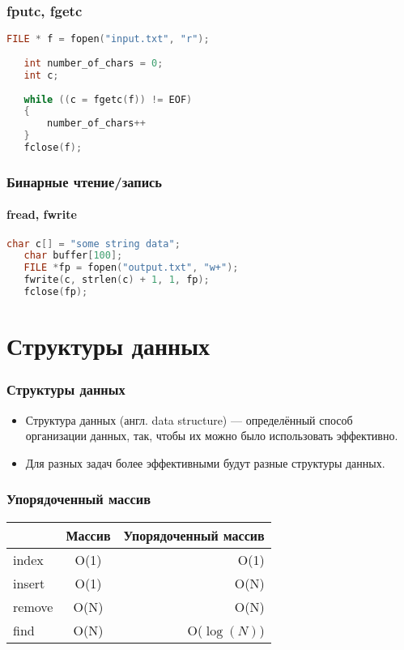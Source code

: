 \documentclass[12pt,pdf,hyperref={unicode}]{beamer}
\begin{document}
\begin{frame}[fragile]
\frametitle{fputc, fgetc}  
\begin{lstlisting}[language=C++,basicstyle=\ttfamily,keywordstyle=\color{blue},stringstyle=\color{orange}\ttfamily]
   FILE * f = fopen("input.txt", "r");
   
   int number_of_chars = 0;
   int c;
   
   while ((c = fgetc(f)) != EOF)
   {
       number_of_chars++
   }
   fclose(f);
\end{lstlisting}
\end{frame}

\begin{frame}[fragile]
\frametitle{Бинарные чтение/запись}  
\framesubtitle{fread, fwrite}  
\begin{lstlisting}[language=C++,basicstyle=\ttfamily,keywordstyle=\color{blue},stringstyle=\color{orange}\ttfamily]
   char c[] = "some string data";
   char buffer[100];
   FILE *fp = fopen("output.txt", "w+");
   fwrite(c, strlen(c) + 1, 1, fp);
   fclose(fp);
\end{lstlisting}
\end{frame}








\section{Структуры данных}


\begin{frame}[fragile]
\frametitle{Структуры данных}
\begin{itemize}
\item Структура данных (англ. data structure) — определённый способ организации данных, так, чтобы их можно было использовать эффективно.
\item Для разных задач более эффективными будут разные структуры данных.
\end{itemize}
\end{frame}


\begin{frame}[fragile]
\frametitle{Упорядоченный массив}
\begin{center}
  \begin{tabular}{  l | c r }
      & Массив & Упорядоченный массив \\
    \hline
    index & O(1) & O(1)\\
    insert & O(1) & O(N)\\
    remove & O(N) & O(N)\\
    find & O(N) & O($\log(N)$)\\
    \hline
  \end{tabular}
\end{center}
\end{frame}
\end{document}
